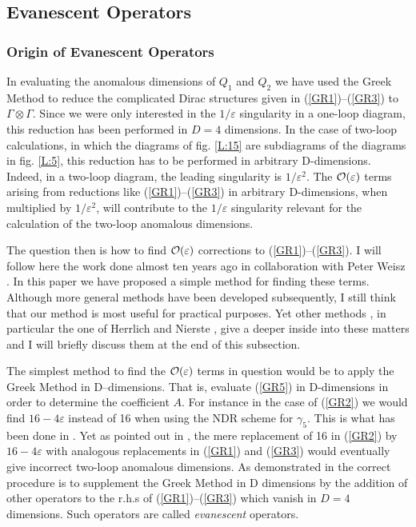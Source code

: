 \documentclass[12pt,rotate]{article}
\newcommand{\ord}{{\cal O}}
\begin{document}
\begin{itemize}
\begin{itemize}
\subsection{Evanescent Operators}
\subsubsection{Origin of Evanescent Operators}
In evaluating the anomalous dimensions of $Q_1$ and $Q_2$ we have used
the Greek Method to reduce the complicated Dirac structures given in
(\ref{GR1})--(\ref{GR3}) to $\Gamma\otimes\Gamma$.
 Since we were only
interested in the $1/\varepsilon$ singularity in a one-loop diagram,
this reduction has been performed in $D=4$ dimensions. In the case of
two-loop calculations, in which the diagrams of fig. \ref{L:15} are
subdiagrams of the diagrams in fig. \ref{L:5}, this reduction has to 
be performed in arbitrary
D-dimensions. Indeed, in a two-loop diagram, the leading singularity
is $1/\varepsilon^2$. The $\ord(\varepsilon)$ terms arising from
reductions like (\ref{GR1})--(\ref{GR3}) in arbitrary D-dimensions, 
when multiplied
by $1/\varepsilon^2$, will contribute to the $1/\varepsilon$
singularity relevant for the calculation of the two-loop
anomalous dimensions.

The question then is how to find $\ord(\varepsilon)$ corrections
to (\ref{GR1})--(\ref{GR3}). I will follow here the work done almost 
ten years ago in collaboration with Peter Weisz \cite{WEISZ}. 
In this paper we have
proposed a simple method for finding these terms. Although more
general methods have been developed subsequently, I still think
that our method is most useful for practical purposes. Yet 
other methods \cite{DuGr,HNE,UN95,SH94}, 
in particular the one of Herrlich and Nierste \cite{HNE,UN95,SH94},
give a deeper inside into these matters and I will briefly
discuss them at the end of this subsection.

The simplest method to find the $\ord(\varepsilon)$ terms in question
would be to apply the Greek Method in D--dimensions. That is, evaluate
(\ref{GR5}) in D-dimensions in order to determine the coefficient $A$.
For instance in the case of (\ref{GR2}) we would find $16-4\varepsilon$
 instead of 16 when using the NDR scheme for $\gamma_5$.
This is what has been done in \cite{GREEK}. Yet as pointed out in
\cite{WEISZ}, the mere replacement of 16 in (\ref{GR2}) 
by $16-4\varepsilon$ with
analogous replacements in (\ref{GR1}) and (\ref{GR3}) would eventually 
give incorrect
two-loop anomalous dimensions. As demonstrated in \cite{WEISZ} the
correct procedure is to supplement
the Greek Method in D dimensions  by the
addition of other operators to the r.h.s of (\ref{GR1})--(\ref{GR3})
which vanish in $D=4$ dimensions. Such operators are called
{\it evanescent} operators.


\end{itemize}
\end{itemize}
\end{document}
